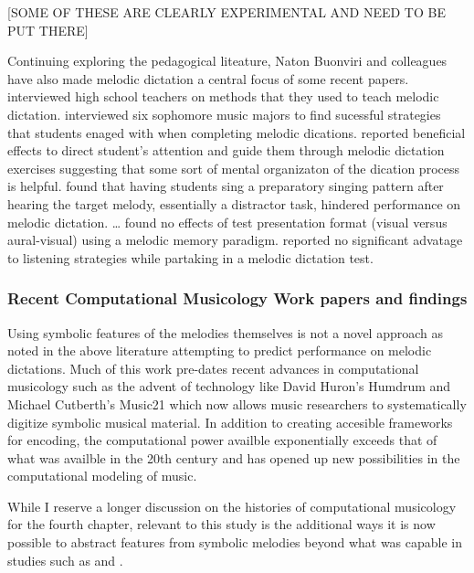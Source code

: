 \documentclass[]{book}
\theoremstyle{definition}
\theoremstyle{definition}
\theoremstyle{definition}
\theoremstyle{remark}
\begin{document}
{[}SOME OF THESE ARE CLEARLY EXPERIMENTAL AND NEED TO BE PUT THERE{]}

Continuing exploring the pedagogical liteature, Naton Buonviri and
colleagues have also made melodic dictation a central focus of some
recent papers. \citet{paneyTeachingMelodicDictation2014} interviewed
high school teachers on methods that they used to teach melodic
dictation. \citet{buonviriEffectsMusicNotation2015} interviewed six
sophomore music majors to find sucessful strategies that students enaged
with when completing melodic dications.
\citet{paneyEffectDirectingAttention2016} reported beneficial effects to
direct student's attention and guide them through melodic dictation
exercises suggesting that some sort of mental organizaton of the
dication process is helpful.
\citet{buonviriMelodicDictationInstruction2015} found that having
students sing a preparatory singing pattern after hearing the target
melody, essentially a distractor task, hindered performance on melodic
dictation. \citet{buonviriEffectsPreparatorySinging2015}\ldots{}
\citet{buonviriEffectsMusicNotation2015} found no effects of test
presentation format (visual versus aural-visual) using a melodic memory
paradigm. \citet{buonviriEffectsTwoListening2017} reported no
significant advatage to listening strategies while partaking in a
melodic dictation test.

\hypertarget{recent-computational-musicology-work-papers-and-findings}{%
\subsubsection{Recent Computational Musicology Work papers and
findings}\label{recent-computational-musicology-work-papers-and-findings}}

Using symbolic features of the melodies themselves is not a novel
approach as noted in the above literature attempting to predict
performance on melodic dictations. Much of this work pre-dates recent
advances in computational musicology such as the advent of technology
like David Huron's Humdrum \citep{huronHumdrumToolkitReference1994} and
Michael Cutberth's Music21
\citep{cuthbertMusic21ToolkitComputerAided2010} which now allows music
researchers to systematically digitize symbolic musical material. In
addition to creating accesible frameworks for encoding, the
computational power availble exponentially exceeds that of what was
availble in the 20th century and has opened up new possibilities in the
computational modeling of music.

While I reserve a longer discussion on the histories of computational
musicology for the fourth chapter, relevant to this study is the
additional ways it is now possible to abstract features from symbolic
melodies beyond what was capable in studies such as
\citet{ortmannTonalDeterminantsMelodic1933} and
\citet{taylorStrategiesMemoryShort1983}.
\end{document}
